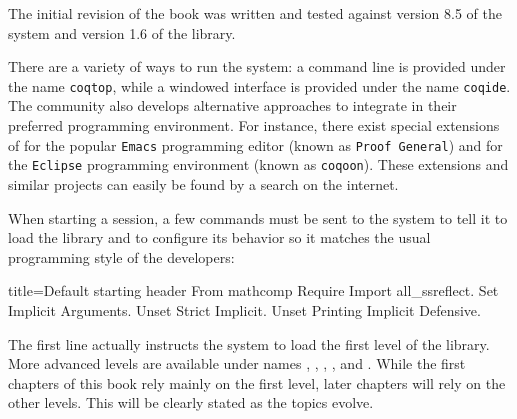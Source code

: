 The initial revision of the book was written and tested against
version 8.5 of the \Coq{} system and version 1.6 of the \mcbMC{} library.

There are a variety of ways to run the \Coq{} system: a command line is
provided under the name \texttt{coqtop}, while a windowed interface is
provided under the name \texttt{coqide}.  The \Coq{} community also develops
alternative approaches to integrate \Coq{} in their preferred programming
environment.  For instance, there exist special extensions of \Coq{} for the
popular \texttt{Emacs} programming editor (known as \texttt{Proof General})
and for the \texttt{Eclipse} programming environment
(known as \texttt{coqoon}).  These extensions and similar projects can easily
be found by a search on the internet.

When starting a \Coq{} session, a few commands must be sent to the \Coq{}
system to tell it to load the \mcbMC{} library and to configure its behavior
so it matches the usual programming style of the \mcbMC{} developers:

\begin{coq}{}{title={Default starting header}}
From mathcomp Require Import all_ssreflect.
Set Implicit Arguments.
Unset Strict Implicit.
Unset Printing Implicit Defensive.
\end{coq}
The first line actually instructs the \Coq{} system to load the first level
of the \mcbMC{} library.  More advanced levels are available under names
, , , ,
and .  While the first chapters of this book
rely mainly on the first
level, later chapters will rely on the other levels.  This will be clearly
stated as the topics evolve.
